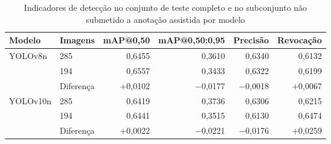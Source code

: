 \begin{table}[htbp]
\centering
\small
\caption{Indicadores de detecção no conjunto de teste completo e no
subconjunto não submetido a anotação assistida por modelo}
\label{tab:anotacao_assistida}
\begin{tabular}{llrrrr}
\toprule
\textbf{Modelo} & \textbf{Imagens} & \textbf{mAP@0,50} &
\textbf{mAP@0,50:0,95} & \textbf{Precisão} & \textbf{Revocação} \\
\midrule
YOLOv8n & 285 & 0,6455 & 0,3610 & 0,6340 & 0,6132 \\
 & 194 & 0,6557 & 0,3433 & 0,6322 & 0,6199 \\
 & Diferença & $+$0,0102 & $-$0,0177 & $-$0,0018 & $+$0,0067 \\
\midrule
YOLOv10n & 285 & 0,6419 & 0,3736 & 0,6306 & 0,6215 \\
 & 194 & 0,6441 & 0,3515 & 0,6130 & 0,6474 \\
 & Diferença & $+$0,0022 & $-$0,0221 & $-$0,0176 & $+$0,0259 \\
\bottomrule
\end{tabular}
\end{table}
